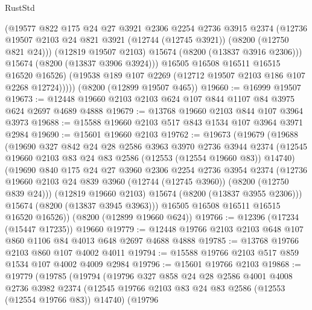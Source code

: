 \begin{lexlean}{RustStd}
\begin{coremodule}
              (@19577
                @822
                @175
                @24
                @27
                @3921
                @2306
                @2254
                @2736
                @3915
                @2374
                (@12736
                  @19507
                  @2103
                  @24
                  @821
                  @3921
                  (@12744 (@12745 @3921))
                  (@8200 (@12750 @821 @24)))
                (@12819 @19507 @2103)
                @15674
                (@8200 (@13837 @3916 @2306)))
              @15674
              (@8200 (@13837 @3906 @3924)))
            @16505
            @16508
            @16511
            @16515
            @16520
            @16526)
          (@19538 @189 @107 @2269 (@12712 @19507 @2103 @186 @107 @2268 @12724)))))
    (@8200 (@12899 @19507 @465))
@19660 := @16999 @19507
@19673 := @12448 @19660 @2103 @2103 @624 @107 @844 @1107 @84 @3975 @624 @2697 @4689 @4888
@19679 := @13768 @19660 @2103 @844 @107 @3964 @3973
@19688 := @15588 @19660 @2103 @517 @843 @1534 @107 @3964 @3971 @2984
@19690 := @15601 @19660 @2103
@19762 := @19673
    (@19679
      (@19688
        (@19690
          @327
          @842
          @24
          @28
          @2586
          @3963
          @3970
          @2736
          @3944
          @2374
          (@12545 @19660 @2103 @83 @24 @83 @2586 (@12553 (@12554 @19660 @83)) @14740)
          (@19690
            @840
            @175
            @24
            @27
            @3960
            @2306
            @2254
            @2736
            @3954
            @2374
            (@12736 @19660 @2103 @24 @839 @3960 (@12744 (@12745 @3960)) (@8200 (@12750 @839 @24)))
            (@12819 @19660 @2103)
            @15674
            (@8200 (@13837 @3955 @2306)))
          @15674
          (@8200 (@13837 @3945 @3963)))
        @16505
        @16508
        @16511
        @16515
        @16520
        @16526))
    (@8200 (@12899 @19660 @624))
@19766 := @12396 (@17234 (@15447 @17235)) @19660
@19779 := @12448 @19766 @2103 @2103 @648 @107 @860 @1106 @84 @4013 @648 @2697 @4688 @4888
@19785 := @13768 @19766 @2103 @860 @107 @4002 @4011
@19794 := @15588 @19766 @2103 @517 @859 @1534 @107 @4002 @4009 @2984
@19796 := @15601 @19766 @2103
@19868 := @19779
    (@19785
      (@19794
        (@19796
          @327
          @858
          @24
          @28
          @2586
          @4001
          @4008
          @2736
          @3982
          @2374
          (@12545 @19766 @2103 @83 @24 @83 @2586 (@12553 (@12554 @19766 @83)) @14740)
          (@19796

\end{coremodule}
\end{lexlean}
